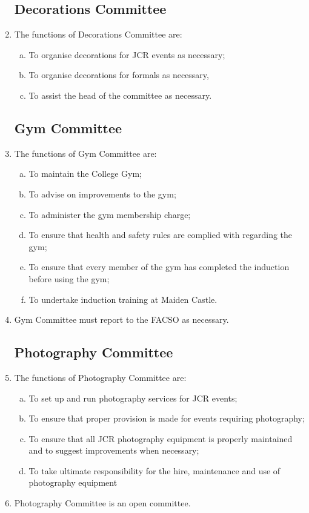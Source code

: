 \documentclass[12pt]{article}  %
\begin{document}
\begin{enumerate}
    \subsection{Decorations Committee}
    \item The functions of Decorations Committee are:
    \begin{enumerate}[(a)]
        \item To organise decorations for JCR events as necessary;
        \item To organise decorations for formals as necessary,
        \item To assist the head of the committee as necessary.
    \end{enumerate}
    \subsection{Gym Committee}
    \item The functions of Gym Committee are:
    \begin{enumerate}[(a)]
        \item To maintain the College Gym;
        \item To advise on improvements to the gym;
        \item To administer the gym membership charge;
        \item To ensure that health and safety rules are complied with regarding the gym;
        \item To ensure that every member of the gym has completed the induction before using the gym;
        \item To undertake induction training at Maiden Castle.
    \end{enumerate}
    \item Gym Committee must report to the FACSO as necessary.
    \subsection{Photography Committee}
    \item The functions of Photography Committee are:
    \begin{enumerate}[(a)]
        \item To set up and run photography services for JCR events;
        \item To ensure that proper provision is made for events requiring photography;
        \item To ensure that all JCR photography equipment is properly maintained and to suggest improvements when necessary;
        \item To take ultimate responsibility for the hire, maintenance and use of photography equipment
    \end{enumerate}
    \item Photography Committee is an open committee.

\end{enumerate}
\end{document}

